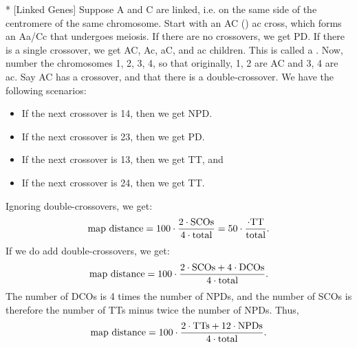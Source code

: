 \begin{exm}*
	[Linked Genes]
	Suppose A and C are linked, i.e. on the same side of the centromere of the same chromosome.
	Start with an AC (\x) ac cross, which forms an Aa/Cc that undergoes meiosis.
	If there are no crossovers, we get PD.
	If there is a single crossover, we get AC, Ac, aC, and ac children. This is called a .
	Now, number the chromosomes 1, 2, 3, 4, so that originally, 1, 2 are AC and 3, 4 are ac. Say AC has a crossover, and that there is a double-crossover.
	We have the following scenarios:
	\begin{itemize}
		\item If the next crossover is 14, then we get NPD.
		\item If the next crossover is 23, then we get PD.
		\item If the next crossover is 13, then we get TT, and
		\item If the next crossover is 24, then we get TT.
	\end{itemize}
	Ignoring double-crossovers, we get: \[
		\textnormal{map distance} = 100\cdot \frac{2\cdot \text{SCOs}}{4\cdot \text{total}} = 50\cdot \frac{\cdot{\text{TT}}}{\text{total}}.
	\]
	If we do add double-crossovers, we get: \[
		\textnormal{map distance} = 100\cdot \frac{2\cdot \text{SCOs} + 4\cdot \text{DCOs}}{4\cdot \text{total}}.
	\]
	The number of DCOs is 4 times the number of NPDs, and the number of SCOs is therefore the number of TTs minus twice the number of NPDs. Thus, \[
		\textnormal{map distance} = 100\cdot \frac{2\cdot \text{TTs} + 12\cdot \text{NPDs}}{4 \cdot \text{total}}.
	\]
\end{exm}
